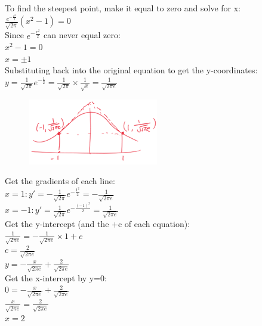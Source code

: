 \documentclass[../main.tex]{subfiles}
\begin{document}
\begin{enumerate}
    To find the steepest point, make it equal to zero and solve for x:\\
    \(\frac{e^{-\frac{x^2}{2}}}{\sqrt{2\pi}}(x^2-1)=0\)\\

    Since \(e^{-\frac{x^2}{2}}\) can never equal zero:\\
    \(x^2-1=0\)\\
    \(x=\pm 1\)\\

    Substituting back into the original equation to get the y-coordinates:\\
    \(y=\frac{1}{\sqrt{2\pi}}e^{-\frac{1}{2}}=\frac{1}{\sqrt{2\pi}}\times \frac{1}{\sqrt{e}}=\frac{1}{\sqrt{2\pi e}}\)
    \begin{figure}[H]
        \centering
        \includegraphics[width=0.25\linewidth]{images/t1w9q3_a.png}
    \end{figure}
    Get the gradients of each line:\\
    \(x=1: y'=-\frac{1}{\sqrt{2\pi}}e^{-\frac{1^2}{2}}=-\frac{1}{\sqrt{2\pi e}}\)\\
    \(x=-1: y'=\frac{1}{\sqrt{2\pi}}e^{-\frac{(-1)^2}{2}}=\frac{1}{\sqrt{2\pi e}}\)\\

    Get the y-intercept (and the +c of each equation):\\
    \(\frac{1}{\sqrt{2\pi e}}=-\frac{1}{\sqrt{2\pi e}}\times 1+c\)\\
    \(c=\frac{2}{\sqrt{2\pi e}}\)\\
    \(y=-\frac{x}{\sqrt{2\pi e}}+\frac{2}{\sqrt{2\pi e}}\)\\
    Get the x-intercept by y=0:\\
    \(0=-\frac{x}{\sqrt{2\pi e}}+\frac{2}{\sqrt{2\pi e}}\)\\
    \(\frac{x}{\sqrt{2\pi e}}=\frac{2}{\sqrt{2\pi e}}\)\\
    \(x=2\)\\


\end{enumerate}
\end{document}
